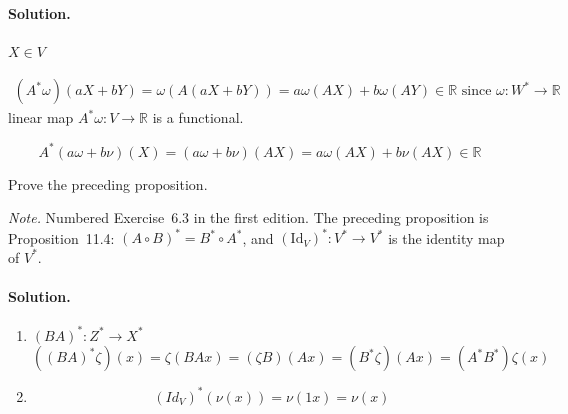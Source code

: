 \paragraph{Solution.} $X \in V$ 

\[
\begin{gathered}
  (A^* \omega)(aX + bY) = \omega(A (aX + bY)) = a\omega(AX) + b \omega(AY) \in \mathbb{R} \text{ since } \omega: W^* \to \mathbb{R}
\end{gathered}
\]
linear map $A^* \omega :V \to \mathbb{R}$ is a functional.

\[
A^*(a\omega + b\nu)(X) = (a\omega + b\nu )(AX) = a\omega(AX)+ b \nu(AX) \in \mathbb{R}
\]

\begin{exercise}
Prove the preceding proposition.
\end{exercise}
\noindent\emph{Note.} Numbered Exercise~6.3 in the first edition. The preceding proposition is Proposition~11.4: $(A\circ B)^*=B^*\circ A^*$, and $(\mathrm{Id}_V)^*\colon V^*\to V^*$ is the identity map of $V^*$.
\paragraph{Solution.}

\begin{enumerate}
\item[(a)] 



$(BA)^* : Z^* \to X^*$
\[
((BA)^* \zeta)(x) = \zeta(BAx) = (\zeta B)(Ax) = (B^* \zeta)(Ax) = (A^* B^*)\zeta(x)
\]

\item[(b)]
\[
(Id_V)^*(\nu(x)) = \nu(1x) = \nu(x)
\]
\end{enumerate}

